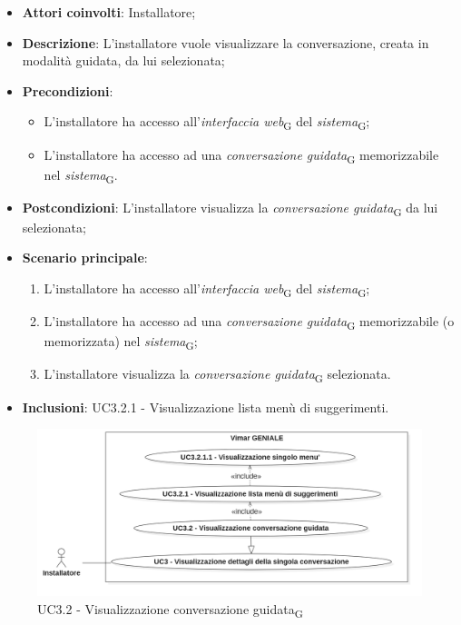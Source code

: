 \begin{itemize}
    \item \textbf{Attori coinvolti}: Installatore;
    \item \textbf{Descrizione}: L'installatore vuole visualizzare la conversazione, creata in modalità guidata, da lui selezionata;
    \item \textbf{Precondizioni}: 
    \begin{itemize}
        \item L’installatore ha accesso all’\textit{interfaccia web}\textsubscript{G} del \textit{sistema}\textsubscript{G};
        \item L’installatore ha accesso ad una \textit{conversazione guidata}\textsubscript{G} memorizzabile nel \textit{sistema}\textsubscript{G}.
    \end{itemize}
    \item \textbf{Postcondizioni}: L'installatore visualizza la \textit{conversazione guidata}\textsubscript{G} da lui selezionata;
    \item \textbf{Scenario principale}:
    \begin{enumerate}
        \item L’installatore ha accesso all’\textit{interfaccia web}\textsubscript{G} del \textit{sistema}\textsubscript{G};
        \item L’installatore ha accesso ad una \textit{conversazione guidata}\textsubscript{G} memorizzabile (o memorizzata) nel \textit{sistema}\textsubscript{G};
        \item L'installatore visualizza la \textit{conversazione guidata}\textsubscript{G} selezionata.
    \end{enumerate}
    \item \textbf{Inclusioni}: UC3.2.1 - Visualizzazione lista menù di suggerimenti.
\end{itemize}
\begin{figure}[H]
\centering
\includegraphics[width=1\textwidth]{contents/casi_duso/png/UC3.2.png}
\caption{UC3.2 - Visualizzazione conversazione guidata\textsubscript{G}}
\end{figure}

